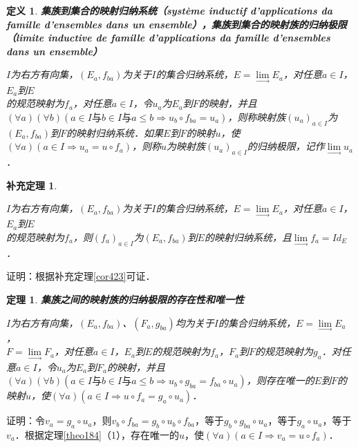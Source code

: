 \documentclass[12pt, a4paper, oneside]{book}
\newtheorem{theo}{定理}
\newtheorem{cor}{补充定理}
\newtheorem{de}{定义}
\begin{document}
			\begin{de}
				\textbf{集族到集合的映射归纳系统（système inductif d'applications da famille d'ensembles dans un ensemble），集族到集合的映射族的归纳极限（limite inductive de famille d'applications da famille d'ensembles dans un ensemble）}
				\par
				$I$为右方有向集，$(E_a, f_{ba})$为关于$I$的集合归纳系统，$E= \lim\limits_\to E_a$，对任意$a\in I$，$E_a$到$E$\\的规范映射为$f_a$，对任意$a\in I$，令$u_a$为$E_a$到$F$的映射，并且$(\forall a)(\forall b)(a\in I\text{与}b\in I\text{与}a\leq b\Rightarrow u_b\circ f_{ba}=u_a)$，则称映射族$(u_a)_{a\in I}$为$(E_a, f_{ba})$到$F$的映射归纳系统．如果$E$到$F$的映射$u$，使$(\forall a)(a\in I\Rightarrow u_a=u\circ f_a)$，则称$u$为映射族$(u_a)_{a\in I}$的归纳极限，记作$\lim\limits_\to u_a$．
			\end{de}
			
			\begin{cor}\label{cor427}
				\hfill\par
				$I$为右方有向集，$(E_a, f_{ba})$为关于$I$的集合归纳系统，$E= \lim\limits_\to E_a$，对任意$a\in I$，$E_a$到$E$\\的规范映射为$f_a$，则$(f_a)_{a\in I}$为$(E_a, f_{ba})$到$E$的映射归纳系统，且$\lim\limits_\to f_a=Id_E$．
			\end{cor}
			证明：根据补充定理\ref{cor423}可证．
					
			\begin{theo}\label{theo185}
				\textbf{集族之间的映射族的归纳极限的存在性和唯一性}
				\par
				$I$为右方有向集，$(E_a, f_{ba})$、$(F_a, g_{ba})$均为关于$I$的集合归纳系统，$E= \lim\limits_\to E_a$，\\$F= \lim\limits_\to F_a$，对任意$a\in I$，$E_a$到$E$的规范映射为$f_a$，$F_a$到$F$的规范映射为$g_a$．对任意$a\in I$，令$u_a$为$E_a$到$F_a$的映射，并且$(\forall a)(\forall b)(a\in I\text{与}b\in I\text{与}a\leq b\Rightarrow u_b\circ g_{ba}=f_{ba}\circ u_a)$，则存在唯一的$E$到$F$的映射$u$，使$(\forall a)(a\in I\Rightarrow u\circ f_a=g_a\circ u_a)$．
			\end{theo}
			证明：令$v_a=g_a\circ u_a$，则$v_b\circ f_{ba}=g_b\circ u_b\circ f_{ba}$，等于$g_b\circ g_{ba}\circ u_a$，等于$g_a\circ u_a$，等于$v_a$．根据定理\ref{theo184}（1），存在唯一的$u$，使$(\forall a)(a\in I\Rightarrow v_a=u\circ f_a)$．
			
\end{document}
